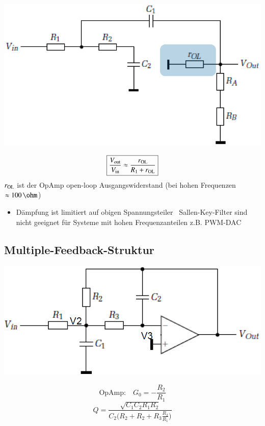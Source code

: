 \begin{minipage}[c]{0.4\columnwidth}  
    \includegraphics[width=\columnwidth]{images/sallen_key_hohe_frequenzen.png}
\end{minipage}
\hfill
\begin{minipage}[c]{0.58\columnwidth}
    $$ \boxed{ \frac{V_{\rm out}}{V_{\rm in}} \approx \frac{r_{\rm OL}}{R_1 + r_{\rm OL}} }$$
    $r_{\rm OL}$ ist der OpAmp open-loop Ausgangswiderstand (bei hohen Frequenzen $\approx 100 \, \ohm$)
\end{minipage}

\begin{itemize}
    \item Dämpfung ist limitiert auf obigen Spannungsteiler
        \textrightarrow\ Sallen-Key-Filter sind nicht geeignet für Systeme mit hohen Frequenzanteilen z.B. PWM-DAC
\end{itemize}


\subsection{Multiple-Feedback-Struktur}

\begin{minipage}[c]{0.4\columnwidth}
    \includegraphics[width=\columnwidth]{images/aktive_filter_multiple_feedback.png}
\end{minipage}
\hfill
\begin{minipage}[c]{0.58\columnwidth}
    $$ \text{OpAmp:} \quad  G_0 = -\frac{R_2}{R_1} $$
    $$ Q = \frac{\sqrt{C_1 C_2 R_1 R_2}}{ C_2 \Big( R_2 + R_2 + R_3 \frac{R_2}{R_1} \Big)} $$
\end{minipage}

